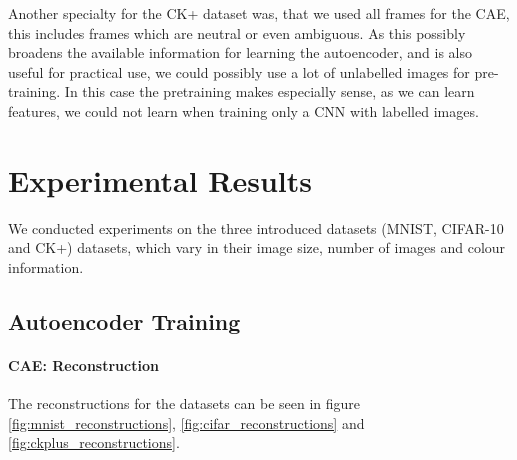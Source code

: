 \documentclass{article}
\begin{document}
      Another specialty for the CK+ dataset was, that we used all frames for the CAE, this includes frames which are neutral or even ambiguous.
      As this possibly broadens the available information for learning the autoencoder, and is also useful for practical use, we could possibly
      use a lot of unlabelled images for pre-training. In this case the pretraining makes especially sense, as we can learn features,
      we could not learn when training only a CNN with labelled images.


\section{Experimental Results}
  We conducted experiments on the three introduced datasets (MNIST, CIFAR-10 and CK+) datasets, which vary in their image size, number of images and colour information.

  
  \subsection{Autoencoder Training}


    \paragraph{CAE: Reconstruction}
    The reconstructions for the datasets can be seen in figure \ref{fig:mnist_reconstructions}, \ref{fig:cifar_reconstructions} and \ref{fig:ckplus_reconstructions}.

\end{document}
